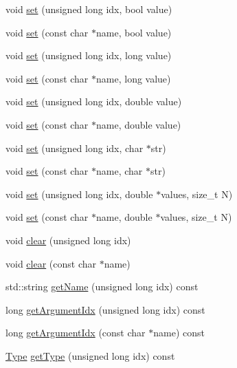 \begin{DoxyCompactItemize}
void \hyperlink{class_frame_lib___parameters_ac6f06219212d719bdbebfd71ef8af498}{set} (unsigned long idx, bool value)
\item 
void \hyperlink{class_frame_lib___parameters_a9dad319808446724cecb563e73468f44}{set} (const char $\ast$name, bool value)
\item 
void \hyperlink{class_frame_lib___parameters_a84c1cba168d37877b3883302af6c3d9e}{set} (unsigned long idx, long value)
\item 
void \hyperlink{class_frame_lib___parameters_abf85c9c040394d99956bd46b0227b3c7}{set} (const char $\ast$name, long value)
\item 
void \hyperlink{class_frame_lib___parameters_a0391ec487908f254507df22ad88e8745}{set} (unsigned long idx, double value)
\item 
void \hyperlink{class_frame_lib___parameters_a6b1af7f2835bd529388055fac19ba494}{set} (const char $\ast$name, double value)
\item 
void \hyperlink{class_frame_lib___parameters_a076802f4d9ac90035a4202c5acb7333f}{set} (unsigned long idx, char $\ast$str)
\item 
void \hyperlink{class_frame_lib___parameters_aaa0b5e9c31955ba649e69ba8971dbe5d}{set} (const char $\ast$name, char $\ast$str)
\item 
void \hyperlink{class_frame_lib___parameters_a2cd3483982c6b856744bdd8782b2f522}{set} (unsigned long idx, double $\ast$values, size\+\_\+t N)
\item 
void \hyperlink{class_frame_lib___parameters_add616cf6328c08d81d1af54ff6109059}{set} (const char $\ast$name, double $\ast$values, size\+\_\+t N)
\item 
void \hyperlink{class_frame_lib___parameters_a5c0764e11e7723b034fc9951b4dcfb3e}{clear} (unsigned long idx)
\item 
void \hyperlink{class_frame_lib___parameters_a6a4c25214fbf10b639346170c957d3f5}{clear} (const char $\ast$name)
\item 
std\+::string \hyperlink{class_frame_lib___parameters_a525cfe083e686bc5de04aee1004f3bfe}{get\+Name} (unsigned long idx) const
\item 
long \hyperlink{class_frame_lib___parameters_a9dd267fcd72252b366d7f0fd5112e668}{get\+Argument\+Idx} (unsigned long idx) const
\item 
long \hyperlink{class_frame_lib___parameters_a91ad76185df1c37e58f18cb7fc81c140}{get\+Argument\+Idx} (const char $\ast$name) const
\item 
\hyperlink{class_frame_lib___parameters_a01bd45aaa25fa8cfaec369e2c8a8371a}{Type} \hyperlink{class_frame_lib___parameters_ae81f3bf43c6301b1abadd5b2539f8925}{get\+Type} (unsigned long idx) const

\end{DoxyCompactItemize}
